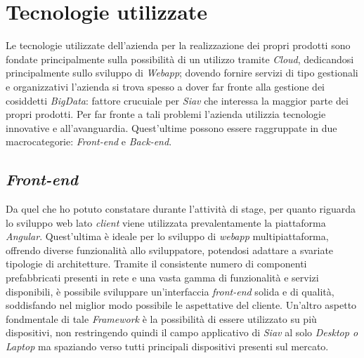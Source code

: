 \section {Tecnologie utilizzate}
Le tecnologie utilizzate dell'azienda per la realizzazione dei propri prodotti sono fondate principalmente sulla possibilità di un utilizzo tramite \textit{\gls{Cloud}}, dedicandosi principalmente sullo sviluppo di \textit{Webapp}; dovendo fornire servizi di tipo gestionali e organizzativi l'azienda si trova spesso a dover far fronte alla gestione dei cosiddetti \textit{\gls{BigData}}: fattore crucuiale per \textit{Siav} che interessa la maggior parte dei propri prodotti. Per far fronte a tali problemi l'azienda utilizzia tecnologie innovative e all'avanguardia. Quest'ultime possono essere raggruppate in due macrocategorie: \textit{Front-end} e \textit{Back-end}.
\subsection{\textit{Front-end}}
Da quel che ho potuto constatare durante l'attività di stage, per quanto riguarda lo sviluppo web lato \textit{client} viene utilizzata prevalentamente la piattaforma \textit{\gls{Angular}}.
Quest'ultima è ideale per lo sviluppo di \textit{webapp} multipiattaforma, offrendo diverse funzionalità allo sviluppatore, potendosi adattare a svariate tipologie di architetture.
 Tramite il consistente numero di componenti prefabbricati presenti in rete e una vasta gamma di funzionalità e servizi disponibili, è possibile sviluppare un'interfaccia \textit{front-end} solida e di qualità, soddisfando nel miglior modo possibile le aspettative del cliente. Un'altro aspetto fondmentale di tale \textit{\gls{Framework}} è la possibilità di essere utilizzato su più dispositivi, non restringendo quindi il campo applicativo di \textit{Siav} al solo \textit{Desktop o Laptop} ma spaziando verso tutti principali dispositivi presenti sul mercato.

